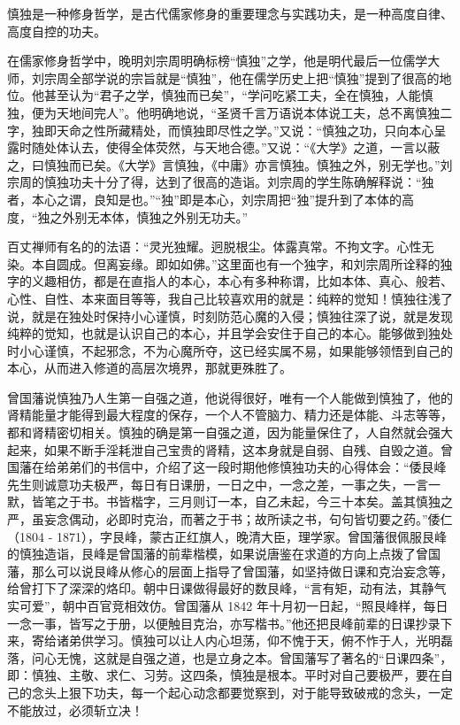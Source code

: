 慎独是一种修身哲学，是古代儒家修身的重要理念与实践功夫，是一种高度自律、高度自控的功夫。

在儒家修身哲学中，晚明刘宗周明确标榜“慎独”之学，他是明代最后一位儒学大师，刘宗周全部学说的宗旨就是“慎独”，他在儒学历史上把“慎独”提到了很高的地位。他甚至认为“君子之学，慎独而已矣”，“学问吃紧工夫，全在慎独，人能慎独，便为天地间完人”。他明确地说，“圣贤千言万语说本体说工夫，总不离慎独二字，独即天命之性所藏精处，而慎独即尽性之学。”又说：“慎独之功，只向本心呈露时随处体认去，使得全体荧然，与天地合德。”又说：“《大学》之道，一言以蔽之，曰慎独而已矣。《大学》言慎独，《中庸》亦言慎独。慎独之外，别无学也。”刘宗周的慎独功夫十分了得，达到了很高的造诣。刘宗周的学生陈确解释说：“独者，本心之谓，良知是也。”“独”即是本心，刘宗周把“独”提升到了本体的高度，“独之外别无本体，慎独之外别无功夫。”

百丈禅师有名的的法语：“灵光独耀。迥脱根尘。体露真常。不拘文字。心性无染。本自圆成。但离妄缘。即如如佛。”这里面也有一个独字，和刘宗周所诠释的独字的义趣相仿，都是在直指人的本心，本心有多种称谓，比如本体、真心、般若、心性、自性、本来面目等等，我自己比较喜欢用的就是：纯粹的觉知！慎独往浅了说，就是在独处时保持小心谨慎，时刻防范心魔的入侵；慎独往深了说，就是发现纯粹的觉知，也就是认识自己的本心，并且学会安住于自己的本心。能够做到独处时小心谨慎，不起邪念，不为心魔所夺，这已经实属不易，如果能够领悟到自己的本心，从而进入修道的高层次境界，那就更殊胜了。

曾国藩说慎独乃人生第一自强之道，他说得很好，唯有一个人能做到慎独了，他的肾精能量才能得到最大程度的保存，一个人不管脑力、精力还是体能、斗志等等，都和肾精密切相关。慎独的确是第一自强之道，因为能量保住了，人自然就会强大起来，如果不断手淫耗泄自己宝贵的肾精，这本身就是自弱、自残、自毁之道。曾国藩在给弟弟们的书信中，介绍了这一段时期他修慎独功夫的心得体会：“倭艮峰先生则诚意功夫极严，每日有日课册，一日之中，一念之差，一事之失，一言一默，皆笔之于书。书皆楷字，三月则订一本，自乙未起，今三十本矣。盖其慎独之严，虽妄念偶动，必即时克治，而著之于书；故所读之书，句句皆切要之药。”倭仁（1804 - 1871），字艮峰，蒙古正红旗人，晚清大臣，理学家。曾国藩很佩服艮峰的慎独造诣，艮峰是曾国藩的前辈楷模，如果说唐鉴在求道的方向上点拨了曾国藩，那么可以说艮峰从修心的层面上指导了曾国藩，如坚持做日课和克治妄念等，给曾打下了深深的烙印。朝中日课做得最好的数艮峰，“言有矩，动有法，其静气实可爱”，朝中百官竞相效仿。曾国藩从 1842 年十月初一日起，“照艮峰样，每日一念一事，皆写之于册，以便触目克治，亦写楷书。”他还把艮峰前辈的日课抄录下来，寄给诸弟供学习。慎独可以让人内心坦荡，仰不愧于天，俯不怍于人，光明磊落，问心无愧，这就是自强之道，也是立身之本。曾国藩写了著名的“日课四条”，即：慎独、主敬、求仁、习劳。这四条，慎独是根本。平时对自己要极严，要在自己的念头上狠下功夫，每一个起心动念都要觉察到，对于能导致破戒的念头，一定不能放过，必须斩立决！

